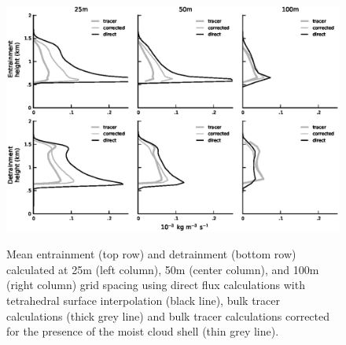 \documentclass[12pt]{article}
\begin{document}
\begin{figure}[t]
  \noindent\includegraphics[width=40pc,angle=0]{./figures/resolution_dependence_core.eps}\\
  \caption{Mean entrainment (top row) and detrainment (bottom row) calculated
at 25m (left column), 50m (center column), and 100m (right column) grid 
spacing using direct flux calculations with tetrahedral surface interpolation 
(black line), bulk tracer calculations (thick grey line) and bulk tracer 
calculations corrected for the presence of the moist cloud shell (thin grey 
line).}\label{fig:resolution_dependence}
\end{figure}
\end{document}
